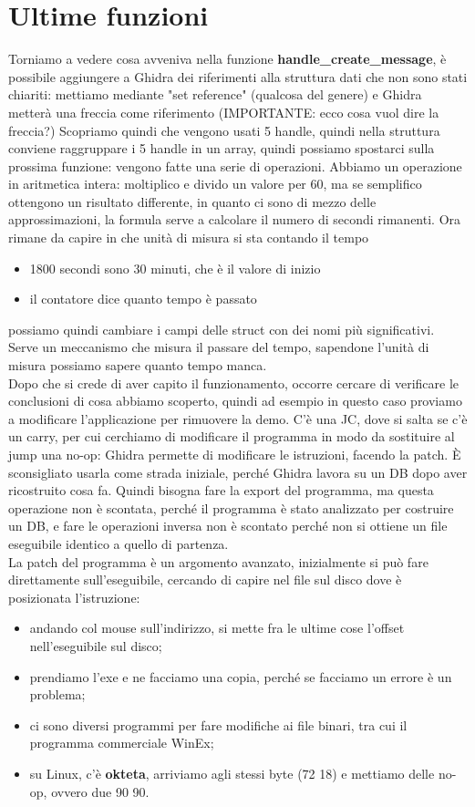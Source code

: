 \documentclass[12pt, oneside]{extbook}
\begin{document}
\section{Ultime funzioni}
Torniamo a vedere cosa avveniva nella funzione \textbf{handle\_create\_message}, è possibile aggiungere a Ghidra dei riferimenti alla struttura dati che non sono stati chiariti: mettiamo mediante "set reference" (qualcosa del genere) e Ghidra metterà una freccia come riferimento (IMPORTANTE: ecco cosa vuol dire la freccia?) 
Scopriamo quindi che vengono usati 5 handle, quindi nella struttura conviene raggruppare i 5 handle in un array, quindi possiamo spostarci sulla prossima funzione: vengono fatte una serie di operazioni. Abbiamo un operazione in aritmetica intera: moltiplico e divido un valore per 60, ma se semplifico ottengono un risultato differente, in quanto ci sono di mezzo delle approssimazioni, la formula serve a calcolare il numero di secondi rimanenti. Ora rimane da capire in che unità di misura si sta contando il tempo
\begin{itemize}
\item 1800 secondi sono 30 minuti, che è il valore di inizio
\item il contatore dice quanto tempo è passato
\end{itemize}
possiamo quindi cambiare i campi delle struct con dei nomi più significativi. Serve un meccanismo che misura il passare del tempo, sapendone l'unità di misura possiamo sapere quanto tempo manca.\\ Dopo che si crede di aver capito il funzionamento, occorre cercare di verificare le conclusioni di cosa abbiamo scoperto, quindi ad esempio in questo caso proviamo a modificare l'applicazione per rimuovere la demo. C'è una JC, dove si salta se c'è un carry, per cui cerchiamo di modificare il programma in modo da sostituire al jump una no-op: Ghidra permette di modificare le istruzioni, facendo la patch. È sconsigliato usarla come strada iniziale, perché Ghidra lavora su un DB dopo aver ricostruito cosa fa. Quindi bisogna fare la export del programma, ma questa operazione non è scontata, perché il programma è stato analizzato per costruire un DB, e fare le operazioni inversa non è scontato perché non si ottiene un file eseguibile identico a quello di partenza.\\ La patch del programma è un argomento avanzato, inizialmente si può fare direttamente sull'eseguibile, cercando di capire nel file sul disco dove è posizionata l'istruzione:
\begin{itemize}
\item andando col mouse sull'indirizzo, si mette fra le ultime cose l'offset nell'eseguibile sul disco;
\item prendiamo l'exe e ne facciamo una copia, perché se facciamo un errore è un problema;
\item ci sono diversi programmi per fare modifiche ai file binari, tra cui il programma commerciale WinEx;
\item su Linux, c'è \textbf{okteta}, arriviamo agli stessi byte (72 18) e mettiamo delle no-op, ovvero due 90 90.
\end{itemize} 
\end{document}
